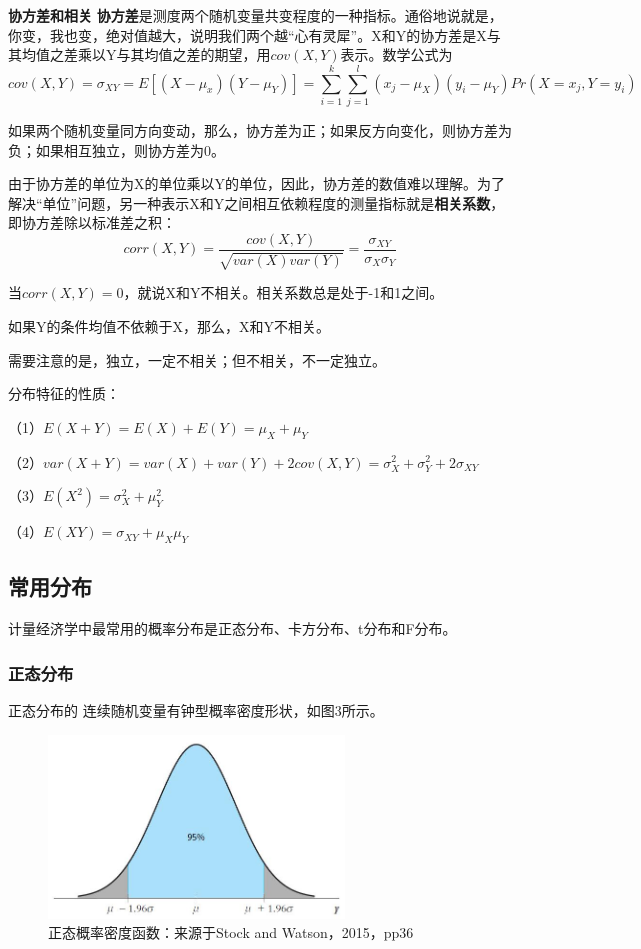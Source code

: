 \documentclass[cn,10pt,math=newtx,citestyle=gb7714-2015,bibstyle=gb7714-2015]{elegantbook}
\begin{document}
	\textbf{协方差和相关}
	\textbf{协方差}是测度两个随机变量共变程度的一种指标。通俗地说就是，你变，我也变，绝对值越大，说明我们两个越“心有灵犀”。X和Y的协方差是X与其均值之差乘以Y与其均值之差的期望，用$cov(X,Y)$表示。数学公式为
	\begin{equation}
		cov(X,Y)=\sigma_{XY}=E[(X-\mu_x)(Y-\mu_Y)]=\sum_{i=1}^{k}{\sum_{j=1}^{l}{(x_j-\mu_X)(y_i-\mu_Y)Pr(X=x_j,Y=y_i)}}
	\end{equation}
	
	如果两个随机变量同方向变动，那么，协方差为正；如果反方向变化，则协方差为负；如果相互独立，则协方差为0。
	
	由于协方差的单位为X的单位乘以Y的单位，因此，协方差的数值难以理解。为了解决“单位”问题，另一种表示X和Y之间相互依赖程度的测量指标就是\textbf{相关系数}，即协方差除以标准差之积：
	\begin{equation}
		corr(X,Y)=\frac{cov(X,Y)}{\sqrt{var(X)var(Y)}}=\frac{\sigma_{XY}}{\sigma_X\sigma_Y}
	\end{equation}
	
	当$corr(X,Y)=0$，就说X和Y不相关。相关系数总是处于-1和1之间。
	
	如果Y的条件均值不依赖于X，那么，X和Y不相关。
	
	需要注意的是，独立，一定不相关；但不相关，不一定独立。
	
	分布特征的性质：
	
	（1）$E(X+Y)=E(X)+E(Y)=\mu_X+\mu_Y$
	
	（2）$var(X+Y)=var(X)+var(Y)+2cov(X,Y)=\sigma_{X}^2+\sigma_{Y}^2+2\sigma_{XY}$
	
	（3）$E(X^2)=\sigma_X^2+\mu_Y^2$
	
	（4）$E(XY)=\sigma_{XY}+\mu_X\mu_Y$
	
	\subsection{常用分布}
	计量经济学中最常用的概率分布是正态分布、卡方分布、t分布和F分布。
	
	\subsubsection{正态分布}
	正态分布的 连续随机变量有钟型概率密度形状，如图3所示。
		\begin{figure}[htbp]
		\centering
		\includegraphics[width=0.7\textwidth]{normal.jpg}
		\caption{正态概率密度函数：来源于Stock and Watson，2015，pp36}\label{fig:digit}
	\end{figure}
	
\end{document}
